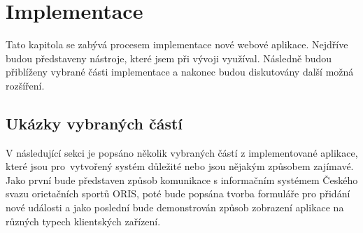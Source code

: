 \chapter{Implementace}
Tato kapitola se zabývá procesem implementace nové webové aplikace. Nejdříve budou představeny nástroje, které jsem při vývoji využíval. Následně budou přiblíženy vybrané části implementace a nakonec budou diskutovány další možná rozšíření.



\section{Ukázky vybraných částí}
V následující sekci je popsáno několik vybraných částí z implementované aplikace, které jsou pro~vytvořený systém důležité nebo jsou nějakým způsobem zajímavé. Jako první bude představen způsob komunikace s informačním systémem Českého svazu orietačních sportů ORIS, poté bude popsána tvorba formuláře pro přidání nové události a jako poslední bude demonstrován způsob zobrazení aplikace na různých typech klientských zařízení.
\newpage





